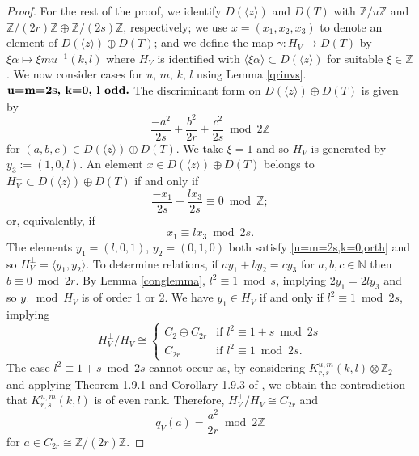 \documentclass[12pt, a4paper]{article}
\newcommand{\ZZ}{\mathbb{Z}}
\newcommand{\NN}{\mathbb{N}}
\newcommand{\la}{\langle}
\newcommand{\ra}{\rangle}
\newcommand{\op}{\oplus}
\begin{document}
\begin{proof}
  For the rest of the proof, we identify $D(\la z \ra)$ and $D(T)$ with $\ZZ/u \ZZ$ and $\ZZ/(2r) \ZZ \op \ZZ / (2s) \ZZ$,  respectively; we use $x = (x_1, x_2, x_3)$ to denote an element of $D(\la z \ra) \op D(T)$; and we define the map $\gamma:H_V \rightarrow D(T)$ by $\xi \alpha \mapsto \xi m u^{-1} (k,l)$ where $H_V$ is identified with $\la \xi \alpha \ra \subset D(\la z \ra)$ for suitable $\xi \in \ZZ$.
We now consider cases for $u$, $m$, $k$, $l$ using Lemma \ref{qrinvs}.\\

\noindent $\textbf{u=m=2s, k=0, l \text{odd}.}$ 
The discriminant form on $D(\la z \ra) \op D(T)$ is given by
\begin{equation}\label{u=m=2s,k=0,form}
  \frac{-a^2}{2s} +  \frac{b^2}{2r} + \frac{c^2}{2s} \bmod{ 2\ZZ}
\end{equation}
for $(a,b,c) \in D(\la z \ra) \op D(T)$.
We take $\xi=1$ and so $H_V$
is generated by $y_3:= (1,0,l)$.
An element $x \in D(\la z \ra) \op D(T)$ belongs to $H_V^{\perp} \subset D(\la z \ra) \op D(T)$ if and only if
\begin{equation*}
  \frac{-x_1}{2s} + \frac{l x_3}{2s} \equiv 0 \bmod{ \ZZ};
\end{equation*}
or, equivalently, if
\begin{equation}\label{u=m=2s,k=0,orth}
  x_1 \equiv  l x_3 \bmod{ 2s}.
\end{equation}
The elements $y_1 = (l,0,1)$, $y_2 = (0,1,0)$ both satisfy \eqref{u=m=2s,k=0,orth} and so $H_V^{\perp} = \la y_1, y_2 \ra$.
To determine relations, if $a y_1 + b y_2 = c y_3$ for $a,b,c \in \NN$ then $b \equiv 0 \bmod{2r}$.
By Lemma \ref{conglemma}, $l^2 \equiv 1 \bmod{ s}$, implying  $2y_1 = 2ly_3$ and so $y_1 \bmod{H_V}$ is of order 1 or 2.
We have $y_1 \in H_V$ if and only if $l^2 \equiv 1 \bmod{2s}$, implying 
  \[
  H_V^{\perp}/H_V \cong
  \begin{cases}
    C_2 \op C_{2r} & \text{if $l^2 \equiv 1 + s \bmod{2s}$} \\
    C_{2r} & \text{if $l^2 \equiv 1 \bmod{2s}$}.
  \end{cases}
  \]
  The case $l^2 \equiv 1 + s \bmod{2s}$ cannot occur as, by considering $K^{u,m}_{r,s}(k,l) \otimes \ZZ_2$ and applying Theorem 1.9.1 and  Corollary 1.9.3 of \cite{Nikulin}, we obtain the contradiction that $K^{u,m}_{r,s}(k,l)$ is of even rank. 
  Therefore, $H_V^{\perp}/H_V \cong C_{2r}$ and  
  \[
  q_V(a)=\frac{a^2}{2r}  \bmod{ 2\ZZ}
  \]
  for $a \in C_{2r} \cong \ZZ/(2r)\ZZ$.



\end{proof}
\end{document}
